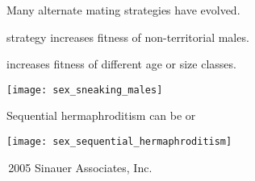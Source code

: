 \documentclass[t]{beamer}
\begin{document}
\begin{frame}{Many alternate mating strategies have evolved.}

\vspace{-\baselineskip}

\begin{multicols}{2}

\hangpara {} strategy increases fitness of non-territorial males.

\vspace{6\baselineskip}

\hangpara {} increases fitness of different age or size classes.

\columnbreak

\centering

\noindent\texttt{[image: sex\_sneaking\_males]}

\smallskip

\end{multicols}

\end{frame}


\begin{frame}{Sequential hermaphroditism can be  or }


\texttt{[image: sex\_sequential\_hermaphroditism]}

\vfilll

\tinyfill \textcopyright\,2005 Sinauer Associates, Inc.

\end{frame}

\end{document}
